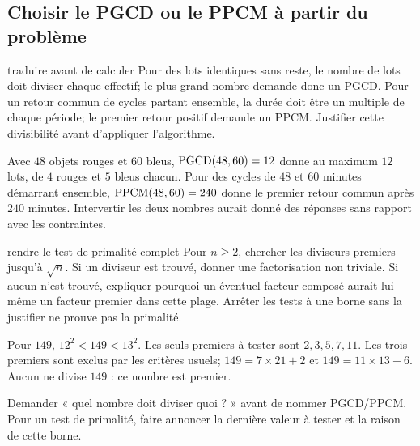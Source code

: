 
\subsection*{Choisir le PGCD ou le PPCM à partir du problème}
\begin{methode}{traduire avant de calculer}
Pour des lots identiques sans reste, le nombre de lots doit diviser chaque effectif; le plus grand nombre demande donc un PGCD. Pour un retour commun de cycles partant ensemble, la durée doit être un multiple de chaque période; le premier retour positif demande un PPCM. Justifier cette divisibilité avant d’appliquer l’algorithme.
\end{methode}
\begin{exemple}
Avec $48$ objets rouges et $60$ bleus, $\operatorname{PGCD}(48,60)=12$ donne au maximum $12$ lots, de $4$ rouges et $5$ bleus chacun. Pour des cycles de $48$ et $60$ minutes démarrant ensemble, $\operatorname{PPCM}(48,60)=240$ donne le premier retour commun après $240$ minutes. Intervertir les deux nombres aurait donné des réponses sans rapport avec les contraintes.
\end{exemple}
\begin{methode}{rendre le test de primalité complet}
Pour $n\ge2$, chercher les diviseurs premiers jusqu’à $\sqrt n$. Si un diviseur est trouvé, donner une factorisation non triviale. Si aucun n’est trouvé, expliquer pourquoi un éventuel facteur composé aurait lui-même un facteur premier dans cette plage. Arrêter les tests à une borne sans la justifier ne prouve pas la primalité.
\end{methode}
\begin{exemple}
Pour $149$, $12^2<149<13^2$. Les seuls premiers à tester sont $2,3,5,7,11$. Les trois premiers sont exclus par les critères usuels; $149=7\times21+2$ et $149=11\times13+6$. Aucun ne divise $149$ : ce nombre est premier.
\end{exemple}
\begin{notepourlaclasse}Demander « quel nombre doit diviser quoi ? » avant de nommer PGCD/PPCM. Pour un test de primalité, faire annoncer la dernière valeur à tester et la raison de cette borne.\end{notepourlaclasse}

